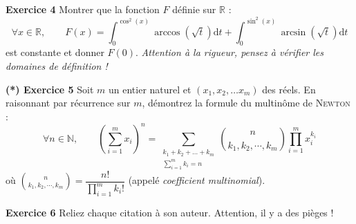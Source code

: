     \noindent \textbf{Exercice 4} Montrer que la fonction $F$ définie sur $\mathbb{R}$  :
    \[ \forall x \in \mathbb{R},\qquad F\left(x\right) = \int_0^{\cos^2\left(x\right)} \arccos\left(\sqrt{t}\right)\mathrm{d}t + \int_0^{\sin^2\left(x\right)} \arcsin\left(\sqrt{t}\right)\mathrm{d}t\]
    est constante et donner $F\left(0\right)$. \textit{Attention à la rigueur, pensez à vérifier les domaines de définition !}
    
    \vspace{40mm}
    
    \noindent \textbf{(*) Exercice 5} Soit $m$ un entier naturel et $\left(x_1, x_2, \dots x_m\right)$ des réels. En raisonnant par récurrence sur $m$, démontrez la formule du multinôme de \textsc{Newton} :
    \[ \forall n \in \mathbb{N},\qquad \left(\sum_{i=1}^m x_i \right)^n = \sum_{\substack{k_1 + k_2 + \dots + k_m\\\sum_{i=1}^m k_i = n}} \binom{n}{k_1,k_2,\cdots,k_m}\prod_{i=1}^m x_i^{k_i}\]
    où $\displaystyle \binom{n}{k_1,k_2,\cdots,k_m} = \dfrac{n!}{\displaystyle\prod_{i=1}^m k_i!}$ (appelé \textit{coefficient multinomial}).
    
    \newpage
    
    \noindent \textbf{Exercice 6} Reliez chaque citation à son auteur. Attention, il y a des pièges !\\
    

